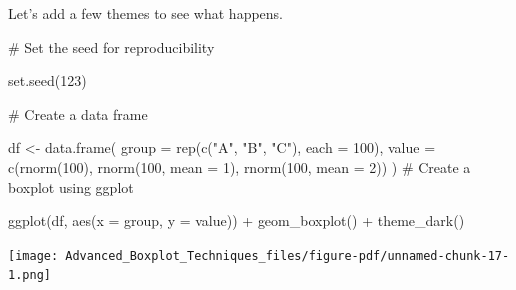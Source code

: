 \documentclass[
  letterpaper,
  DIV=11,
  numbers=noendperiod]{scrreprt}
\newenvironment{Shaded}{\begin{snugshade}}{\end{snugshade}}
\newcommand{\AttributeTok}[1]{\textcolor[rgb]{0.40,0.45,0.13}{#1}}
\newcommand{\CommentTok}[1]{\textcolor[rgb]{0.37,0.37,0.37}{#1}}
\newcommand{\DecValTok}[1]{\textcolor[rgb]{0.68,0.00,0.00}{#1}}
\newcommand{\FunctionTok}[1]{\textcolor[rgb]{0.28,0.35,0.67}{#1}}
\newcommand{\NormalTok}[1]{\textcolor[rgb]{0.00,0.23,0.31}{#1}}
\newcommand{\OtherTok}[1]{\textcolor[rgb]{0.00,0.23,0.31}{#1}}
\newcommand{\SpecialCharTok}[1]{\textcolor[rgb]{0.37,0.37,0.37}{#1}}
\newcommand{\StringTok}[1]{\textcolor[rgb]{0.13,0.47,0.30}{#1}}
\begin{document}
Let's add a few themes to see what happens.

\begin{Shaded}
\begin{Highlighting}[]
\CommentTok{\# Set the seed for reproducibility}

\FunctionTok{set.seed}\NormalTok{(}\DecValTok{123}\NormalTok{)}

\CommentTok{\# Create a data frame}

\NormalTok{df }\OtherTok{\textless{}{-}} \FunctionTok{data.frame}\NormalTok{(}
  \AttributeTok{group =} \FunctionTok{rep}\NormalTok{(}\FunctionTok{c}\NormalTok{(}\StringTok{"A"}\NormalTok{, }\StringTok{"B"}\NormalTok{, }\StringTok{"C"}\NormalTok{), }\AttributeTok{each =} \DecValTok{100}\NormalTok{),}
  \AttributeTok{value =} \FunctionTok{c}\NormalTok{(}\FunctionTok{rnorm}\NormalTok{(}\DecValTok{100}\NormalTok{), }\FunctionTok{rnorm}\NormalTok{(}\DecValTok{100}\NormalTok{, }\AttributeTok{mean =} \DecValTok{1}\NormalTok{), }\FunctionTok{rnorm}\NormalTok{(}\DecValTok{100}\NormalTok{, }\AttributeTok{mean =} \DecValTok{2}\NormalTok{))}
\NormalTok{)}
\CommentTok{\# Create a boxplot using ggplot}

\FunctionTok{ggplot}\NormalTok{(df, }\FunctionTok{aes}\NormalTok{(}\AttributeTok{x =}\NormalTok{ group, }\AttributeTok{y =}\NormalTok{ value)) }\SpecialCharTok{+}
  \FunctionTok{geom\_boxplot}\NormalTok{() }\SpecialCharTok{+}
  \FunctionTok{theme\_dark}\NormalTok{()}
\end{Highlighting}
\end{Shaded}

\begin{center}
\texttt{[image: Advanced\_Boxplot\_Techniques\_files/figure-pdf/unnamed-chunk-17-1.png]}
\end{center}
\end{document}
